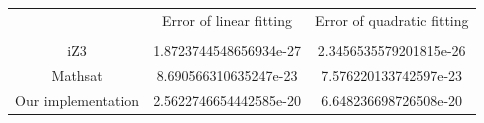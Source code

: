 \begin{table}[h]
  \centering
  \begin{tabular}{ccc}
    \toprule
    {}                 & Error of linear fitting & Error of quadratic fitting \\
    \cmidrule{2-2} \cmidrule{3-3} \\
    iZ3                &  1.8723744548656934e-27 & 2.3456535579201815e-26     \\
    Mathsat            &  8.690566310635247e-23  & 7.576220133742597e-23      \\
    Our implementation &  2.5622746654442585e-20 & 6.648236698726508e-20      \\
    \bottomrule
  \end{tabular}
\end{table}

